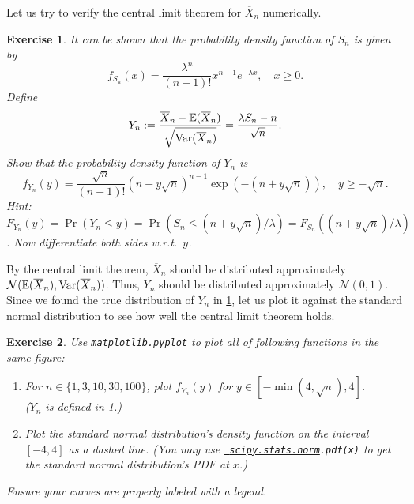 \documentclass[12pt]{article}
\newcommand*{\Xbar}{\overline{X}}
\newcommand*{\Ncal}{\mathcal{N}}
\newtheorem{exercise}{Exercise}[section]
\begin{document}
Let us try to verify the central limit theorem for $\Xbar_n$ numerically.

\begin{tcolorbox}[mathExe]
\begin{exercise}
\label{exe:exp:y-distr}
It can be shown that the probability density function of $S_n$ is given by
\[ f_{S_n}(x) = \frac{\lambda^n}{(n-1)!}x^{n-1}e^{-\lambda x}, \quad x \ge 0. \]
Define
\[ Y_n \defeq \frac{\Xbar_n - \E(\Xbar_n)}{\sqrt{\Var(\Xbar_n)}} = \frac{\lambda S_n - n}{\sqrt{n}}. \]
Show that the probability density function of $Y_n$ is
\[ f_{Y_n}(y) = \frac{\sqrt{n}}{(n-1)!}\left(n + y\sqrt{n}\right)^{n-1} \exp\left(-(n + y\sqrt{n})\right),
    \quad y \ge -\sqrt{n}. \]
\textcolor{mathExeSec}{Hint:
$F_{Y_n}(y) = \Pr(Y_n \le y) = \Pr(S_n \le (n + y\sqrt{n})/\lambda) = F_{S_n}((n + y\sqrt{n})/\lambda)$.
Now differentiate both sides w.r.t.~$y$.}
\end{exercise}
\end{tcolorbox}

By the central limit theorem, $\Xbar_n$ should be distributed approximately $\Ncal(\E(\Xbar_n), \Var(\Xbar_n))$.
Thus, $Y_n$ should be distributed approximately $\Ncal(0, 1)$.
Since we found the true distribution of $Y_n$ in \cref{exe:exp:y-distr},
let us plot it against the standard normal distribution to see
how well the central limit theorem holds.

\begin{tcolorbox}[progExe]
\begin{exercise}
\label{exe:exp:y-plot}
Use \texttt{matplotlib.pyplot} to plot all of following functions in the same figure:
\begin{enumerate}
\item For $n \in \{1, 3, 10, 30, 100\}$, plot $f_{Y_n}(y)$ for $y \in [-\min(4, \sqrt{n}), 4]$.
    \\ \textcolor{progExeSec}{($Y_n$ is defined in \cref{exe:exp:y-distr}.)}
\item Plot the standard normal distribution's density function on the interval $[-4, 4]$ as a dashed line.
    \textcolor{progExeSec}{(You may use
    \texttt{\href{https://docs.scipy.org/doc/scipy/reference/generated/scipy.stats.norm.html}{%
\textcolor{progExeSec}{scipy.stats.norm}}.pdf(x)} to get the standard normal distribution's PDF at $x$.)}
\end{enumerate}
Ensure your curves are properly labeled with a legend.
\end{exercise}
\end{tcolorbox}
\end{document}
